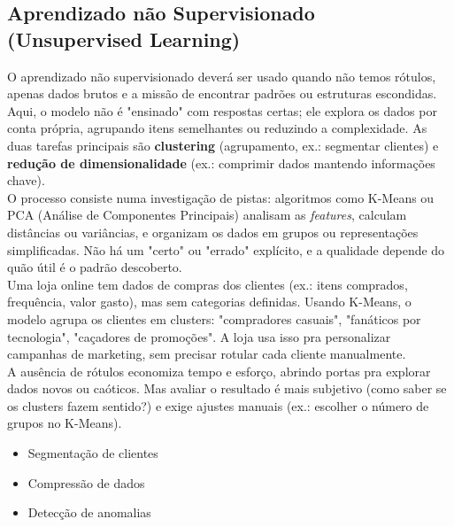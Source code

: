 \documentclass[a4paper,12pt,openany]{book}
\begin{document}
\subsection{Aprendizado não Supervisionado (Unsupervised Learning)}
O aprendizado não supervisionado deverá ser usado quando não temos rótulos, apenas dados brutos e a missão de encontrar padrões ou estruturas escondidas. Aqui, o modelo não é "ensinado" com respostas certas; ele explora os dados por conta própria, agrupando itens semelhantes ou reduzindo a complexidade. As duas tarefas principais são \textbf{clustering} (agrupamento, ex.: segmentar clientes) e \textbf{redução de dimensionalidade} (ex.: comprimir dados mantendo informações chave).\\
O processo consiste numa investigação de pistas: algoritmos como K-Means ou PCA (Análise de Componentes Principais) analisam as \textit{features}, calculam distâncias ou variâncias, e organizam os dados em grupos ou representações simplificadas. Não há um "certo" ou "errado" explícito, e a qualidade depende do quão útil é o padrão descoberto. \\
Uma loja online tem dados de compras dos clientes (ex.: itens comprados, frequência, valor gasto), mas sem categorias definidas. Usando K-Means, o modelo agrupa os clientes em clusters: "compradores casuais", "fanáticos por tecnologia", "caçadores de promoções". A loja usa isso pra personalizar campanhas de marketing, sem precisar rotular cada cliente manualmente.\\
A ausência de rótulos economiza tempo e esforço, abrindo portas pra explorar dados novos ou caóticos. Mas avaliar o resultado é mais subjetivo (como saber se os clusters fazem sentido?) e exige ajustes manuais (ex.: escolher o número de grupos no K-Means).
    \begin{itemize}
        \item Segmentação de clientes
        \item Compressão de dados
        \item Detecção de anomalias
    \end{itemize}
\end{document}
